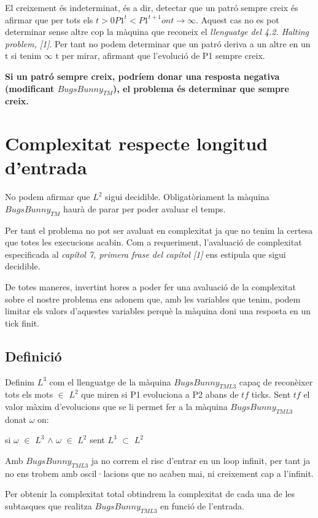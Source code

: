 \documentclass[12pt,a4paper]{report}
\def \w{$\omega$}
\def \tm{$BugsBunny_{TM} $}
\def \tml3{$BugsBunny_{TML3} $}
\begin{document}
El creixement és indeterminat, és a dir, detectar que un patró sempre creix és afirmar que per tots els $t > 0 P1^t < P1^{t+1} on t \rightarrow \infty$. Aquest cas no es pot determinar sense altre cop la màquina que reconeix el \textit{llenguatge del 4.2. Halting problem, [1]}. Per tant no podem determinar que un patró deriva a un altre en un t si tenim $\infty$ t per mirar, afirmant que l’evolució de P1 sempre creix.

\textbf{Si un patró sempre creix, podríem donar una resposta negativa (modificant \tm{}), el problema és determinar que sempre creix.}

\section{Complexitat respecte longitud d'entrada}

No podem afirmar que $L^2$ sigui decidible. Obligatòriament la màquina \tm{} haurà de parar per poder avaluar el temps.

Per tant el problema no pot ser avaluat en complexitat ja que no tenim la certesa que totes les execucions acabin. Com a requeriment, l’avaluació de complexitat especificada al \textit{capítol 7, primera frase del capítol [1]} ens estipula que sigui decidible.

De totes maneres, invertint hores a poder fer una avaluació de la complexitat sobre el nostre problema ens adonem que, amb les variables que tenim, podem limitar els valors d’aquestes variables perquè la màquina doni una resposta en un tick finit.

\subsection{Definició}

Definim $L^3$ com el llenguatge de la màquina \tml3{} capaç de reconèixer tots els mots $\in$ $L^2$ que miren si P1 evoluciona a P2 abans de $tf$ ticks. Sent $tf$ el valor màxim d’evolucions que se li permet fer a la màquina \tml3{} donat \w{} on:

\begin{center}
si \w{} $\in$ $L^3$ $\wedge$ \w{} $\in$ $L^2$ sent $L^3$ $\subset$ $L^2$
\end{center}

Amb \tml3{} ja no correm el risc d’entrar en un loop infinit, per tant ja no ens trobem amb oscil·lacions que no acaben mai, ni creixement cap a l’infinit. 

Per obtenir la complexitat total obtindrem la complexitat de cada una de les subtasques que realitza \tml3{} en funció de l’entrada.
\end{document}
